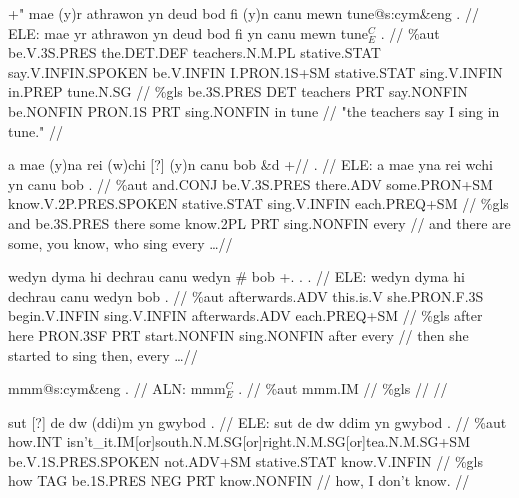 \documentclass[a4paper,10pt]{article}
\begin{document}
\ex
\begingl[lingstyle=gergl]
\glchat +" mae (y)r athrawon yn deud bod fi (y)n canu mewn tune@s:cym\&eng . //
\glsurface ELE:  mae yr athrawon yn deud bod fi yn canu mewn tune$^{C}_{E}$ .  //
\glauto \%aut  be{\scriptsize .V.3S.PRES} the{\scriptsize .DET.DEF} teachers{\scriptsize .N.M.PL} stative{\scriptsize .STAT} say{\scriptsize .V.INFIN.SPOKEN} be{\scriptsize .V.INFIN} I{\scriptsize .PRON.1S+SM} stative{\scriptsize .STAT} sing{\scriptsize .V.INFIN} in{\scriptsize .PREP} tune{\scriptsize .N.SG}   //
\glmanual \%gls  be{\scriptsize .3S.PRES} DET teachers PRT say{\scriptsize .NONFIN} be{\scriptsize .NONFIN} PRON{\scriptsize .1S} PRT sing{\scriptsize .NONFIN} in tune   //
\gleng "the teachers say I sing in tune." //
\endgl
\xe

\ex
\begingl[lingstyle=gergl]
\glchat a mae (y)na rei (w)chi [?] (y)n canu bob \&d +// . //
\glsurface ELE:  a mae yna rei wchi yn canu bob .  //
\glauto \%aut  and{\scriptsize .CONJ} be{\scriptsize .V.3S.PRES} there{\scriptsize .ADV} some{\scriptsize .PRON+SM} know{\scriptsize .V.2P.PRES.SPOKEN} stative{\scriptsize .STAT} sing{\scriptsize .V.INFIN} each{\scriptsize .PREQ+SM}   //
\glmanual \%gls  and be{\scriptsize .3S.PRES} there some know{\scriptsize .2PL} PRT sing{\scriptsize .NONFIN} every   //
\gleng and there are some, you know, who sing every \dots  //
\endgl
\xe

\ex
\begingl[lingstyle=gergl]
\glchat wedyn dyma hi dechrau canu wedyn \# bob +. . . //
\glsurface ELE:  wedyn dyma hi dechrau canu wedyn bob .  //
\glauto \%aut  afterwards{\scriptsize .ADV} this{\scriptsize .is.V} she{\scriptsize .PRON.F.3S} begin{\scriptsize .V.INFIN} sing{\scriptsize .V.INFIN} afterwards{\scriptsize .ADV} each{\scriptsize .PREQ+SM}   //
\glmanual \%gls  after here PRON{\scriptsize .3SF} PRT start{\scriptsize .NONFIN} sing{\scriptsize .NONFIN} after every  //
\gleng then she started to sing then, every \dots  //
\endgl
\xe

\ex
\begingl[lingstyle=gergl]
\glchat mmm@s:cym\&eng . //
\glsurface ALN:  mmm$^{C}_{E}$ .  //
\glauto \%aut  mmm{\scriptsize .IM}   //
\glmanual \%gls     //
\gleng  //
\endgl
\xe

\ex
\begingl[lingstyle=gergl]
\glchat sut [?] de dw (ddi)m yn gwybod . //
\glsurface ELE:  sut de dw ddim yn gwybod .  //
\glauto \%aut  how{\scriptsize .INT} isn't\_it{\scriptsize .IM[or]south.N.M.SG[or]right.N.M.SG[or]tea.N.M.SG+SM} be{\scriptsize .V.1S.PRES.SPOKEN} not{\scriptsize .ADV+SM} stative{\scriptsize .STAT} know{\scriptsize .V.INFIN}   //
\glmanual \%gls  how TAG be{\scriptsize .1S.PRES} NEG PRT know{\scriptsize .NONFIN}   //
\gleng how, I don't know. //
\endgl
\xe
\end{document}
